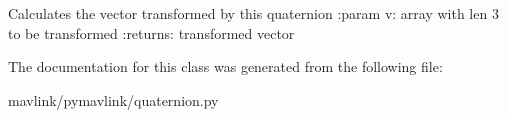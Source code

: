 \begin{DoxyVerb}Calculates the vector transformed by this quaternion
:param v: array with len 3 to be transformed
:returns: transformed vector
\end{DoxyVerb}
 

The documentation for this class was generated from the following file\+:\begin{DoxyCompactItemize}
\item 
mavlink/pymavlink/quaternion.\+py\end{DoxyCompactItemize}
